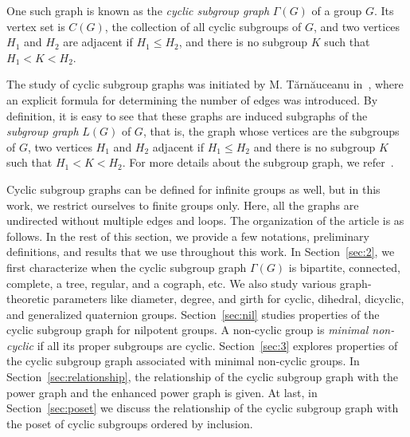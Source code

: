 \documentclass[11pt,twoside]{amsart}
\begin{document}
One such graph is known as the {\em cyclic subgroup graph} $\Gamma (G)$ of a group $G$. Its vertex set is $C(G)$, the collection of all cyclic subgroups of $G$, and two vertices $H_1$ and $H_2$ are adjacent if $H_1\leq H_2$, and there is no subgroup $K$ such that $H_1< K< H_2$.

The study of cyclic subgroup graphs was initiated by M. Tărnăuceanu in~\cite{tuarnuauceanu2023number}, where an explicit formula for determining the number of edges was introduced. By definition, it is easy to see that these graphs are induced subgraphs of the {\em subgroup graph} $L(G)$ of $G$, that is, the graph whose vertices are the subgroups of $G$, two vertices $H_1$ and $H_2$ adjacent if $H_1\leq H_2$ and there is no subgroup $K$ such that $H_1<K<H_2$. For more details about the subgroup graph, we refer~\cite{bohanon2006finite, lucchini2021genus, schmidt2006planar}.

Cyclic subgroup graphs can be defined for infinite groups as well, but in this work, we restrict ourselves to finite groups only. Here, all the graphs are undirected without multiple edges and loops. The organization of the article is as follows. In the rest of this section, we provide a few notations, preliminary definitions, and results that we use throughout this work. In Section~\ref{sec:2}, we first characterize when the cyclic subgroup graph $\Gamma (G)$ is bipartite, connected, complete, a tree, regular, and a cograph, etc. We also study various graph-theoretic parameters like diameter, degree, and girth for cyclic, dihedral, dicyclic, and generalized quaternion groups. Section~\ref{sec:nil} studies properties of the cyclic subgroup graph for nilpotent groups. A non-cyclic group is {\em minimal non-cyclic} if all its proper subgroups are cyclic. Section~\ref{sec:3} explores properties of the cyclic subgroup graph associated with minimal non-cyclic groups. In Section~\ref{sec:relationship}, the relationship of the cyclic subgroup graph with the power graph and the enhanced power graph is given. At last, in Section~\ref{sec:poset} we discuss the relationship of the cyclic subgroup graph with the poset of cyclic subgroups ordered by inclusion.
\end{document}
